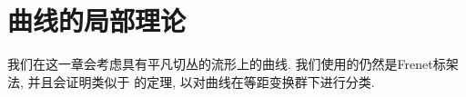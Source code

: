 \chapter{曲线的局部理论}\label{chapter_curve}

我们在这一章会考虑具有平凡切丛的流形上的曲线.
我们使用的仍然是Frenet标架法, 并且会证明类似于 %
的定理, 以对曲线在等距变换群下进行分类.